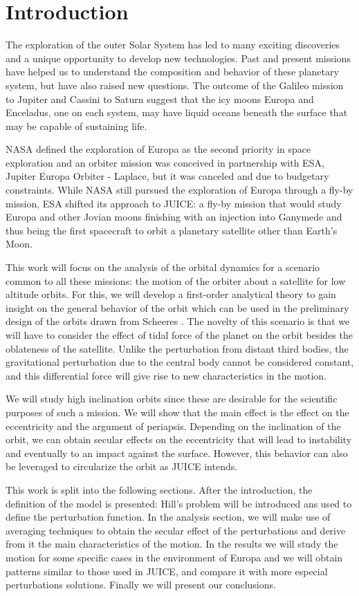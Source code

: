 \section{Introduction}
The exploration of the outer Solar System has led to many exciting discoveries and a unique opportunity to develop new technologies. Past and present missions have helped us to understand the composition and behavior of these planetary system, but have also raised new questions. The outcome of the Galileo mission to Jupiter and Cassini to Saturn suggest that the icy moons Europa and Enceladus, one on each system, may have liquid oceans beneath the surface that may be capable of sustaining life.

NASA defined the exploration of Europa as the second priority in space exploration \cite{nasa2011vision} and an orbiter mission was conceived in partnership with ESA, Jupiter Europa Orbiter - Laplace, but it was canceled and due to budgetary constraints. While NASA still pursued the exploration of Europa through a fly-by mission, ESA shifted its approach to JUICE: a fly-by mission that would study Europa and other Jovian moons finishing with an injection into Ganymede \cite{esa2011juice} and thus being the first spacecraft to orbit a planetary satellite other than Earth's Moon.

This work will focus on the analysis of the orbital dynamics for a scenario common to all these missions: the motion of the orbiter about a satellite for low altitude orbits. For this, we will develop a first-order analytical theory to gain insight on the general behavior of the orbit which can be used in the preliminary design of the orbits drawn from Scheeres \cite{scheeres2012orbital} \cite{scheeres2001stability}. The novelty of this scenario is that we will have to consider the effect of tidal force of the planet on the orbit besides the oblateness of the satellite. Unlike the perturbation from distant third bodies, the gravitational perturbation due to the central body cannot be considered constant, and this differential force will give rise to new characteristics in the motion.

We will study high inclination orbits since these are desirable for the scientific purposes of such a mission. We will show that the main effect is the effect on the eccentricity and the argument of periapsis. Depending on the inclination of the orbit, we can obtain secular effects on the eccentricity that will lead to instability and eventually to an impact against the surface. However, this behavior can also be leveraged to circularize the orbit as JUICE intends.

This work is split into the following sections. After the introduction, the definition of the model is presented: Hill's problem will be introduced ans used to define the perturbation function. In the analysis section, we will make use of averaging techniques to obtain the secular effect of the perturbations and derive from it the main characteristics of the motion. In the results we will study the motion for some specific cases in the environment of Europa and we will obtain patterns similar to those used in JUICE, and compare it with more especial perturbations solutions. Finally we will present our conclusions.


